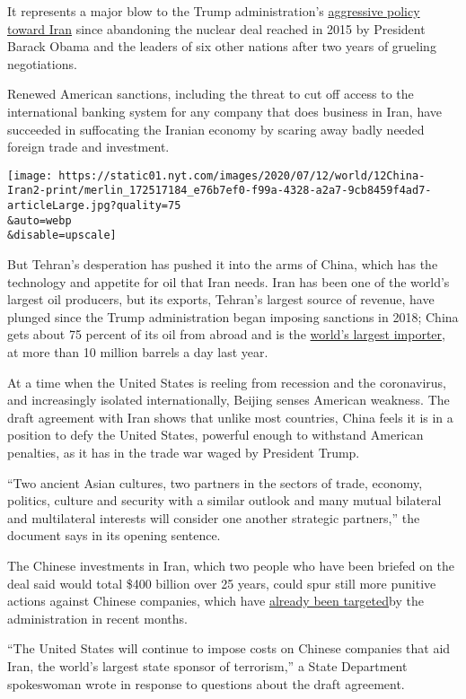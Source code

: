 It represents a major blow to the Trump administration's
\href{https://www.nytimes.com/2020/01/08/world/middleeast/trump-iran-nuclear-sanctions.html}{aggressive
policy toward Iran} since abandoning the nuclear deal reached in 2015 by
President Barack Obama and the leaders of six other nations after two
years of grueling negotiations.

Renewed American sanctions, including the threat to cut off access to
the international banking system for any company that does business in
Iran, have succeeded in suffocating the Iranian economy by scaring away
badly needed foreign trade and investment.

\texttt{[image: https://static01.nyt.com/images/2020/07/12/world/12China-Iran2-print/merlin\_172517184\_e76b7ef0-f99a-4328-a2a7-9cb8459f4ad7-articleLarge.jpg?quality=75\\\&auto=webp\\\&disable=upscale]}

But Tehran's desperation has pushed it into the arms of China, which has
the technology and appetite for oil that Iran needs. Iran has been one
of the world's largest oil producers, but its exports, Tehran's largest
source of revenue, have plunged since the Trump administration began
imposing sanctions in 2018; China gets about 75 percent of its oil from
abroad and is the
\href{https://www.eia.gov/todayinenergy/detail.php?id=43216}{world's
largest importer}, at more than 10 million barrels a day last year.

At a time when the United States is reeling from recession and the
coronavirus, and increasingly isolated internationally, Beijing senses
American weakness. The draft agreement with Iran shows that unlike most
countries, China feels it is in a position to defy the United States,
powerful enough to withstand American penalties, as it has in the trade
war waged by President Trump.

``Two ancient Asian cultures, two partners in the sectors of trade,
economy, politics, culture and security with a similar outlook and many
mutual bilateral and multilateral interests will consider one another
strategic partners,'' the document says in its opening sentence.

The Chinese investments in Iran, which two people who have been briefed
on the deal said would total \$400 billion over 25 years, could spur
still more punitive actions against Chinese companies, which have
\href{https://www.nytimes.com/2019/07/22/world/asia/sanctions-china-iran-oil.html}{already
been targeted}by the administration in recent months.

``The United States will continue to impose costs on Chinese companies
that aid Iran, the world's largest state sponsor of terrorism,'' a State
Department spokeswoman wrote in response to questions about the draft
agreement.

